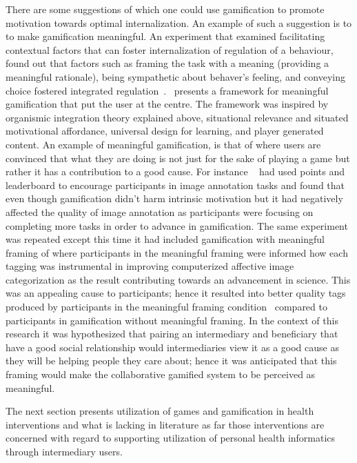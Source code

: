 There are some suggestions of which one could use gamification to promote motivation towards optimal internalization. An example of such a suggestion is to to make gamification meaningful. An experiment that examined facilitating contextual factors that can foster internalization of regulation of a behaviour, found out that factors such as framing the task with a meaning (providing a meaningful rationale), being sympathetic about behaver's  feeling, and conveying choice fostered integrated regulation~\citep{deci1994facilitating}.~\cite{nicholson2012user} presents a framework for meaningful gamification that put the user at the centre. The framework was inspired by organismic integration theory explained above, situational relevance and situated motivational affordance, universal design for learning, and player generated content. An example of meaningful gamification, is that of where users are convinced that what they are doing is not just for the sake of playing a game but rather it has a contribution to a good cause. For instance ~\cite{mekler2013points} had used points and leaderboard to encourage participants in image annotation tasks and found that even though gamification didn't harm intrinsic motivation but it had negatively affected the quality of image annotation as participants were focusing on completing more tasks in order to advance in gamification. The same experiment was repeated except this time it had included gamification with meaningful framing of where participants in the meaningful framing were informed how each tagging was instrumental in improving computerized affective image categorization as the result contributing towards an advancement in science. This was an appealing cause to participants; hence it resulted into better quality tags produced by participants in the meaningful framing condition~\citep{mekler2013disassembling} compared to participants in gamification without meaningful framing. In the context of this research it was hypothesized that pairing an intermediary and beneficiary that have a good social relationship would intermediaries view it as a good cause as they will be helping people they care about; hence it was anticipated that this framing would make the collaborative gamified system to be perceived as meaningful.

The next section presents utilization of games and gamification in health interventions and what is lacking in literature as far those interventions are concerned with regard to supporting utilization of personal health informatics through intermediary users.

